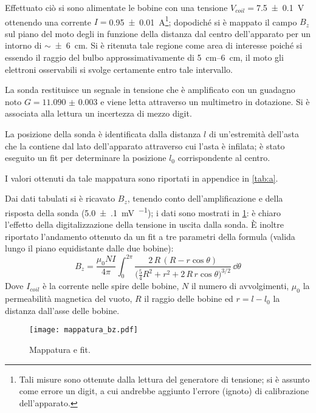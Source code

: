 Effettuato ciò si sono alimentate le bobine con una tensione $V_{coil}=$\SI{7.5 \pm 0.1}{\volt} ottenendo una corrente $I=$\SI{0.95 \pm 0.01}{\ampere}\footnote{Tali misure sono ottenute dalla lettura del generatore di tensione; si è assunto come errore un digit, a cui andrebbe aggiunto l'errore (ignoto) di calibrazione dell'apparato.}; dopodiché si è mappato il campo $B_z$ sul piano del moto degli \e in funzione della distanza dal centro dell'apparato per un intorno di $\sim $\SI{\pm 6}{\cm}.
Si è ritenuta tale regione come area di interesse poiché si essendo il raggio del bulbo approssimativamente di \SIrange{5}{6}{\cm}, il moto gli elettroni osservabili si svolge certamente entro tale intervallo.

La sonda restituisce un segnale in tensione che è amplificato con un guadagno noto 
$G = \num{11.090(3)}$ e viene letta attraverso un multimetro in dotazione. Si è associata alla lettura un incertezza di mezzo digit.

La posizione della sonda è identificata dalla distanza $l$ di un'estremità dell'asta che la contiene dal lato dell'apparato attraverso cui l'asta è infilata; è stato eseguito un fit per determinare la posizione $l_0$ corrispondente al centro.

I valori ottenuti da tale mappatura sono riportati in appendice in \tablename{ \ref{tab:a}}.

Dai dati tabulati si è ricavato $B_z$, tenendo conto dell'amplificazione e della risposta della sonda (\SI{5.0(1)}{\mV\per\gauss}); i dati sono mostrati in \figurename{ \ref{fig:fit1}}: è chiaro l'effetto della digitalizzazione della tensione in uscita dalla sonda. È inoltre riportato l'andamento ottenuto da un fit a tre parametri della formula (valida lungo il piano equidistante dalle due bobine):
\begin{equation} \label{eq:bz}
		B_z = \frac{\mu_0 N I}{4 \pi} \int_0^{2\pi} \frac{2\, R\, (R - r \cos\theta )}{\big(\frac{5}{4} R^2 + r^2 + 2\, R \, r \cos \theta\big) ^ {3/2}} \, \dd \theta
\end{equation}
Dove $I_{coil}$ è la corrente nelle spire delle bobine, $N$ il numero di avvolgimenti, $\mu_0$ la permeabilità magnetica del vuoto, $R$ il raggio delle bobine ed $r = l - l_0$ la distanza dall'asse delle bobine.


\begin{figure}[H]
	\centering
	\texttt{[image: mappatura\_bz.pdf]}
	\caption{Mappatura e fit.}
	\label{fig:fit1}
\end{figure}

